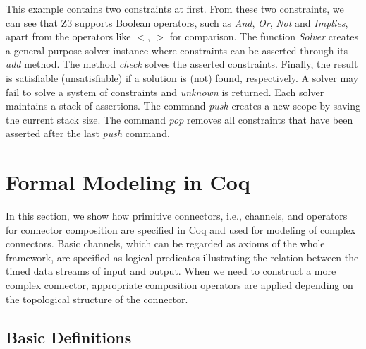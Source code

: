 \documentclass[preprint,3p]{elsarticle}
\begin{document}
This example contains two constraints at first. From these two constraints, we can see that Z3 supports Boolean operators, such as \emph{And}, \emph{Or}, \emph{Not} and \emph{Implies}, apart from the operators like $<$, $>$ for comparison.
The function \emph{Solver} creates a general purpose solver instance where constraints can be asserted through its \emph{add} method. The method \emph{check} solves the asserted constraints. Finally, the result is satisfiable (unsatisfiable) if a solution is (not) found, respectively. A solver may fail to solve a system of constraints and \emph{unknown} is returned. Each solver maintains a stack of assertions. The command \emph{push} creates a new scope by saving the current stack size. The command \emph{pop} removes all constraints that have been asserted after the last \emph{push} command.


\section{Formal Modeling in Coq}\label{sec:channelandoperator}
In this section, we show how primitive connectors, i.e., channels, and operators for connector composition are specified in Coq and used for modeling of complex connectors. Basic channels, which can be regarded as axioms of the whole framework, are specified as logical predicates illustrating the relation between the timed data streams of input and output. When we need to construct a more complex connector, appropriate composition operators are applied depending on the topological structure of the connector.

\subsection{Basic Definitions}\label{sec:basicdef}

\end{document}
